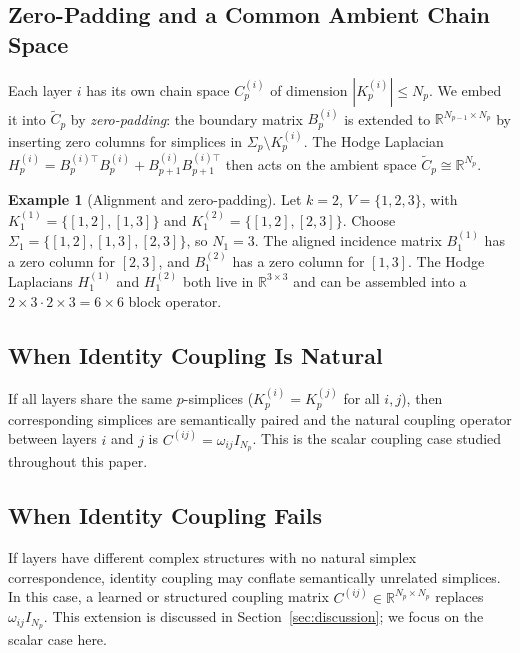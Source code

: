 \documentclass[11pt]{article}
\theoremstyle{definition}
\newtheorem{example}[theorem]{Example}
\theoremstyle{remark}
\newcommand{\R}{\mathbb{R}}
\newcommand{\Ctil}{\widetilde{C}}
\begin{document}
\subsection{Zero-Padding and a Common Ambient Chain Space}

Each layer $i$ has its own chain space $C_p^{(i)}$ of dimension
$|K_p^{(i)}|\leq N_p$. We embed it into $\Ctil_p$ by \emph{zero-padding}: the
boundary matrix $B_p^{(i)}$ is extended to $\R^{N_{p-1}\times N_p}$ by
inserting zero columns for simplices in $\Sigma_p\setminus K_p^{(i)}$. The
Hodge Laplacian $H_p^{(i)} = B_p^{(i)\top}B_p^{(i)} + B_{p+1}^{(i)}
B_{p+1}^{(i)\top}$ then acts on the ambient space $\Ctil_p \cong \R^{N_p}$.

\begin{example}[Alignment and zero-padding]
\label{ex:align}
Let $k=2$, $V=\{1,2,3\}$, with $K_1^{(1)}=\{[1,2],[1,3]\}$ and
$K_1^{(2)}=\{[1,2],[2,3]\}$. Choose $\Sigma_1=\{[1,2],[1,3],[2,3]\}$,
so $N_1=3$. The aligned incidence matrix $B_1^{(1)}$ has a zero column for
$[2,3]$, and $B_1^{(2)}$ has a zero column for $[1,3]$. The Hodge Laplacians
$H_1^{(1)}$ and $H_1^{(2)}$ both live in $\R^{3\times 3}$ and can be assembled
into a $2\times 3 \cdot 2\times 3 = 6\times 6$ block operator.
\end{example}

\subsection{When Identity Coupling Is Natural}

If all layers share the same $p$-simplices ($K_p^{(i)}=K_p^{(j)}$ for all
$i,j$), then corresponding simplices are semantically paired and the natural
coupling operator between layers $i$ and $j$ is $C^{(ij)}=\omega_{ij}I_{N_p}$.
This is the scalar coupling case studied throughout this paper.

\subsection{When Identity Coupling Fails}

If layers have different complex structures with no natural simplex
correspondence, identity coupling may conflate semantically unrelated simplices.
In this case, a learned or structured coupling matrix $C^{(ij)}\in\R^{N_p\times
N_p}$ replaces $\omega_{ij}I_{N_p}$. This extension is discussed in
Section~\ref{sec:discussion}; we focus on the scalar case here.


\end{document}
